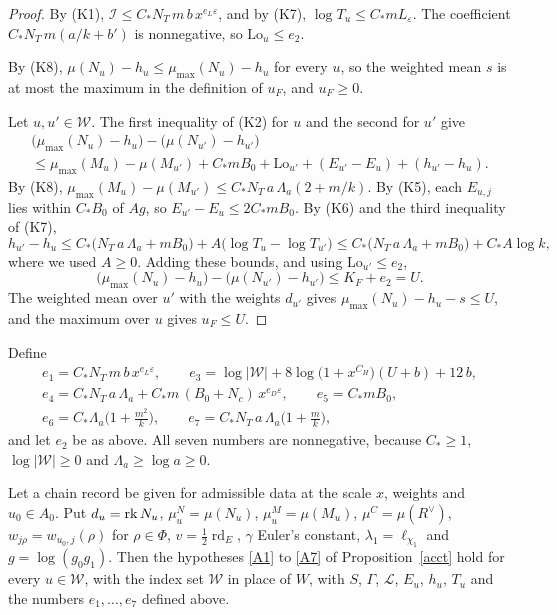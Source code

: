 \begin{proof}
By (K1), $\mathcal I\le C_\ast N_T\,m\,b\,x^{e_L\varepsilon}$, and by (K7), $\log T_u\le C_\ast mL_\varepsilon$. The coefficient $C_\ast N_T\,m(a/k+b')$ is nonnegative, so $\mathrm{Lo}_u\le e_2$.

By (K8), $\mu(N_u)-h_u\le\mu_{\max}(N_u)-h_u$ for every $u$, so the weighted mean $s$ is at most the maximum in the definition of $u_F$, and $u_F\ge0$.

Let $u,u'\in\mathcal W$. The first inequality of (K2) for $u$ and the second for $u'$ give
\begin{multline*}
\big(\mu_{\max}(N_u)-h_u\big)-\big(\mu(N_{u'})-h_{u'}\big)\\
\le\mu_{\max}(M_u)-\mu(M_{u'})+C_\ast mB_0+\mathrm{Lo}_{u'}+(E_{u'}-E_u)+(h_{u'}-h_u).
\end{multline*}
By (K8), $\mu_{\max}(M_u)-\mu(M_{u'})\le C_\ast N_T\,a\,\Lambda_a(2+m/k)$. By (K5), each $E_{u,j}$ lies within $C_\ast B_0$ of $Ag$, so $E_{u'}-E_u\le2C_\ast mB_0$. By (K6) and the third inequality of (K7),
\[
h_{u'}-h_u\le C_\ast\big(N_T\,a\,\Lambda_a+mB_0\big)+A\big(\log T_u-\log T_{u'}\big)\le C_\ast\big(N_T\,a\,\Lambda_a+mB_0\big)+C_\ast A\log k ,
\]
where we used $A\ge0$. Adding these bounds, and using $\mathrm{Lo}_{u'}\le e_2$,
\[
\big(\mu_{\max}(N_u)-h_u\big)-\big(\mu(N_{u'})-h_{u'}\big)\le K_F+e_2=U .
\]
The weighted mean over $u'$ with the weights $d_{u'}$ gives $\mu_{\max}(N_u)-h_u-s\le U$, and the maximum over $u$ gives $u_F\le U$.
\end{proof}

Define
\begin{gather*}
e_1=C_\ast N_T\,m\,b\,x^{e_L\varepsilon},\qquad e_3=\log\lvert\mathcal W\rvert+8\log\big(1+x^{C_H}\big)(U+b)+12\,b,\\
e_4=C_\ast N_T\,a\,\Lambda_a+C_\ast m\,(B_0+N_c)\,x^{e_D\varepsilon},\qquad e_5=C_\ast mB_0,\\
e_6=C_\ast\Lambda_a\Big(1+\frac{m^2}k\Big),\qquad e_7=C_\ast N_T\,a\,\Lambda_a\Big(1+\frac mk\Big),
\end{gather*}
and let $e_2$ be as above. All seven numbers are nonnegative, because $C_\ast\ge1$, $\log\lvert\mathcal W\rvert\ge0$ and $\Lambda_a\ge\log a\ge0$.

\begin{proposition}\label{r6:R6:prop:A1A7}
Let a chain record be given for admissible data at the scale $x$, weights and $u_0\in A_0$. Put $d_u=\operatorname{rk} N_u$, $\mu^N_u=\mu(N_u)$, $\mu^M_u=\mu(M_u)$, $\mu^C=\mu(R^\vee)$, $w_{j\rho}=w_{u_0,j}(\rho)$ for $\rho\in\Phi$, $v=\frac12\operatorname{rd}_E$, $\gamma$ Euler's constant, $\lambda_1=\ell_{\chi_1}$ and $g=\log(g_0g_1)$. Then the hypotheses \eqref{A1} to \eqref{A7} of Proposition~\ref{acct} hold for every $u\in\mathcal W$, with the index set $\mathcal W$ in place of $W$, with $S$, $\Gamma$, $\mathcal L$, $E_u$, $h_u$, $T_u$ and the numbers $e_1,\dots,e_7$ defined above.
\end{proposition}


